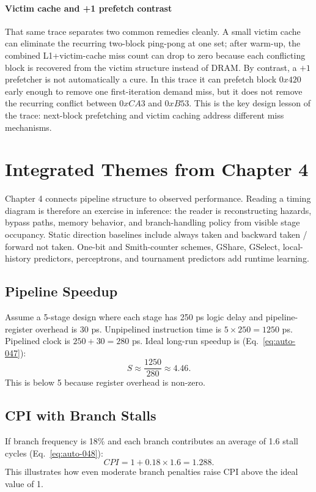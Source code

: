 \paragraph{Victim cache and +1 prefetch contrast}\label{par:auto-027b}
That same trace separates two common remedies cleanly.
A small victim cache can eliminate the recurring two-block ping-pong at one set; after warm-up, the combined L1+victim-cache miss count can drop to zero because each conflicting block is recovered from the victim structure instead of DRAM\@.
By contrast, a $+1$ prefetcher is not automatically a cure.
In this trace it can prefetch block $0x420$ early enough to remove one first-iteration demand miss, but it does not remove the recurring conflict between $0xCA3$ and $0xB53$.
This is the key design lesson of the trace: next-block prefetching and victim caching address different miss mechanisms.


\section{Integrated Themes from Chapter 4}\label{sec:auto-049}
Chapter 4 connects pipeline structure to observed performance.
Reading a timing diagram is therefore an exercise in inference: the reader is reconstructing hazards, bypass paths, memory behavior, and branch-handling policy from visible stage occupancy.
Static direction baselines include always taken and backward taken / forward not taken.
One-bit and Smith-counter schemes, GShare, GSelect, local-history predictors, perceptrons, and tournament predictors add runtime learning.

\subsection*{Pipeline Speedup}\label{subsec:auto-012}
Assume a 5-stage design where each stage has 250 ps logic delay and pipeline-register overhead is 30 ps.
Unpipelined instruction time is $5\times250=1250$ ps.
Pipelined clock is $250+30=280$ ps.
Ideal long-run speedup is (Eq.~\eqref{eq:auto-047}):
\begin{equation}\label{eq:auto-047}
    S\approx\frac{1250}{280}\approx 4.46.
\end{equation}
This is below 5 because register overhead is non-zero.

\subsection*{CPI with Branch Stalls}\label{subsec:auto-013}
If branch frequency is 18\% and each branch contributes an average of 1.6 stall cycles (Eq.~\eqref{eq:auto-048}):
\begin{equation}\label{eq:auto-048}
    CPI = 1 + 0.18\times1.6 = 1.288.
\end{equation}
This illustrates how even moderate branch penalties raise CPI above the ideal value of 1.

